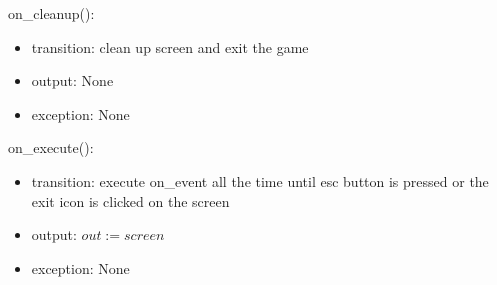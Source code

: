 \documentclass[12pt]{article}
\begin{document}
\noindent on\_cleanup():
\begin{itemize}
\item transition: clean up screen and exit the game
\item output: None
\item exception: None
\end{itemize}

\noindent on\_execute():
\begin{itemize}
\item transition: execute on\_event all the time until esc button is pressed or the exit icon is clicked on the screen
\item output: $out := screen$
\item exception: None
\end{itemize}
\end{document}
